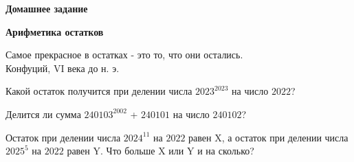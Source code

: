 \centerline{\bf \Huge Домашнее задание}
\centerline{\bf \Huge Арифметика остатков}

\begin{flushright}
        \scriptsize{Самое прекрасное в остатках - это то, что они остались. \\Конфуций, VI века до н. э. }
\end{flushright}


 Какой остаток получится при делении числа $2023^{2023}$ на число $2022$?

 Делится ли сумма $240103^{2002}$ + $240101$ на число $240102$?

 Остаток при делении числа $2024^{11}$ на $2022$ равен X, а остаток при делении числа $2025^5$ на $2022$ равен Y. Что больше X или Y и на сколько?